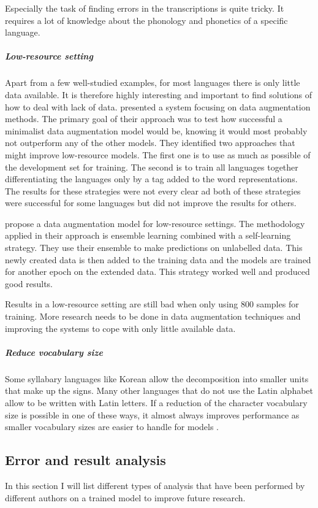 Especially the task of finding errors in the transcriptions is quite tricky. It requires a lot of knowledge about the phonology and phonetics of a specific language. 

\subparagraph{Low-resource setting}
Apart from a few well-studied examples, for most languages there is only little data available. It is therefore highly interesting and important to find solutions of how to deal with lack of data. \cite{hammond-2021-data} presented a system focusing on data augmentation methods. The primary goal of their approach was to test how successful a minimalist data augmentation model would be, knowing it would most probably not outperform any of the other models. They identified two approaches that might improve low-resource models. The first one is to use as much as possible of the development set for training. The second is to train all languages together differentiating the languages only by a tag added to the word representations. The results for these strategies were not every clear ad both of these strategies were successful for some languages but did not improve the results for others.

\citet{yu-etal-2020} propose a data augmentation model for low-resource settings. The methodology applied in their approach is ensemble learning combined with a self-learning strategy. They use their ensemble to make predictions on unlabelled data. This newly created data is then added to the training data and the models are trained for another epoch on the extended data. This strategy worked well and produced good results. 

Results in a low-resource setting are still bad when only using 800 samples for training. More research needs to be done in data augmentation techniques and improving the systems to cope with only little available data.

\subparagraph{Reduce vocabulary size}
Some syllabary languages like Korean allow the decomposition into smaller units that make up the signs. Many other languages that do not use the Latin alphabet allow to be written with Latin letters. If a reduction of the character vocabulary size is possible in one of these ways, it almost always improves performance as smaller vocabulary sizes are easier to handle for models \citep{gorman-etal-2020-sigmorphon}. 


\subsection{Error and result analysis}
In this section I will list different types of analysis that have been performed by different authors on a trained model to improve future research.

